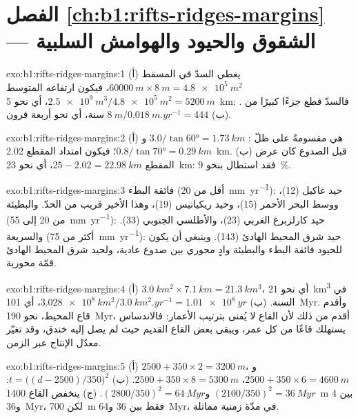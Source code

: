 \section*{الفصل \ref{ch:b1:rifts-ridges-margins} --- الشقوق والحيود والهوامش السلبية}

\begin{solution}{exo:b1:rifts-ridges-margins:1}
(أ) يغطي السدّ في المسقط $\qty{60000}{m}\times\qty{8}{m} = \qty{4.8e5}{m^2}$، فيكون ارتفاعه المتوسط $\qty{2.5e9}{m^3}/\qty{4.8e5}{m^2} =
\qty{5200}{m}$، أي نحو \qty{5}{km}: فالسدّ قطع جزءًا كبيرًا من . (ب) $\qty{8}{m}/\qty{0.018}{m.yr^{-1}} = 444$ سنة، أي نحو أربعة قرون.
\end{solution}

\begin{solution}{exo:b1:rifts-ridges-margins:2}
(أ)  هي  مقسومةً على ظلّ :
$3.0/\tan\ang{60} = \qty{1.73}{km}$ و$0.8/\tan\ang{70} = \qty{0.29}{km}$؛
فيكون امتداد المقطع \qty{2.02}{km}. (ب) قبل الصدوع كان عرض المقطع $25 - 2.02 = \qty{22.98}{km}$، أي نحو \qty{23}{km}: فقد استطال بنحو \qty{9}{\percent}.
\end{solution}

\begin{solution}{exo:b1:rifts-ridges-margins:3}
فائقة البطء (أقل من \qty{20}{mm.yr^{-1}}): حيد غاكيل (12)، ووسط البحر الأحمر (15)، وحيد ريكيانيس (19)، وهذا الأخير قريب من الحدّ. والبطيئة (من 20 إلى \qty{55}{mm.yr^{-1}}): حيد كارلزبرغ الغربي (23)، والأطلسي الجنوبي (33). والسريعة (أكثر من \qty{75}{mm.yr^{-1}}): حيد شرق المحيط الهادئ (143). وينبغي أن يكون للحيود فائقة البطء والبطيئة وادٍ محوري بين صدوع عادية، ولحيد شرق المحيط الهادئ قمّة محورية.
\end{solution}

\begin{solution}{exo:b1:rifts-ridges-margins:4}
(أ) $\qty{3.0}{km^2}\times\qty{7.1}{km} = \qty{21.3}{km^3}$، أي نحو \qty{21}{km^3} في السنة. (ب) $\qty{3.028e8}{km^2}/\qty{3.0}{km^2.yr^{-1}} =
\qty{1.01e8}{yr}$، أي \qty{101}{Myr}. وأقدم قاع المحيط، نحو \qty{190}{Myr}، أقدم من ذلك لأن القاع لا يُفنى بترتيب الأعمار: فالاندساس يستهلك قاعًا من كل عمر، ويبقى بعض القاع القديم حيث لم يصل إليه خندق، وقد تغيّر معدّل الإنتاج عبر الزمن.
\end{solution}

\begin{solution}{exo:b1:rifts-ridges-margins:5}
(أ) $2500 + 350\times2 = \qty{3200}{m}$، و$2500 + 350\times6 = \qty{4600}{m}$،
$2500 + 350\times8 = \qty{5300}{m}$. (ب) $t = \bigl((d - 2500)/350\bigr)^2$:
$(2100/350)^2 = \qty{36}{Myr}$ و$(2800/350)^2 = \qty{64}{Myr}$. (ج) ينخفض القاع \qty{1400}{m} بين 4 و\qty{36}{Myr}، لكن \qty{700}{m} فقط بين 36 و\qty{64}{Myr}، في مدّة زمنية مماثلة.
\end{solution}

